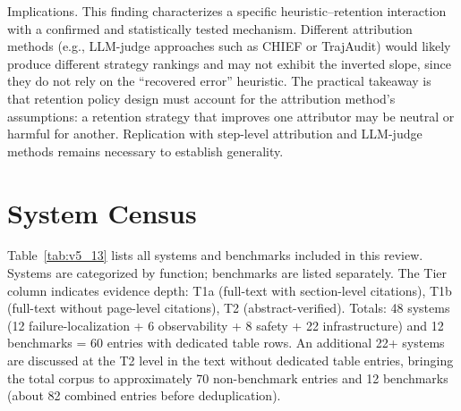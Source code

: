 \documentclass[preprint,12pt]{elsarticle}
\begin{document}
Implications. This finding characterizes a specific heuristic--retention interaction with a confirmed and statistically tested mechanism. Different attribution methods (e.g., LLM-judge approaches such as CHIEF or TrajAudit) would likely produce different strategy rankings and may not exhibit the inverted slope, since they do not rely on the ``recovered error'' heuristic. The practical takeaway is that retention policy design must account for the attribution method's assumptions: a retention strategy that improves one attributor may be neutral or harmful for another. Replication with step-level attribution and LLM-judge methods remains necessary to establish generality.


\section{System Census}\label{app:census}
Table~\ref{tab:v5_13} lists all systems and benchmarks included in this review. Systems are categorized by function; benchmarks are listed separately. The Tier column indicates evidence depth: T1a (full-text with section-level citations), T1b (full-text without page-level citations), T2 (abstract-verified). Totals: 48 systems (12 failure-localization + 6 observability + 8 safety + 22 infrastructure) and 12 benchmarks = 60 entries with dedicated table rows. An additional 22+ systems are discussed at the T2 level in the text without dedicated table entries, bringing the total corpus to approximately 70 non-benchmark entries and 12 benchmarks (about 82 combined entries before deduplication).
\end{document}

